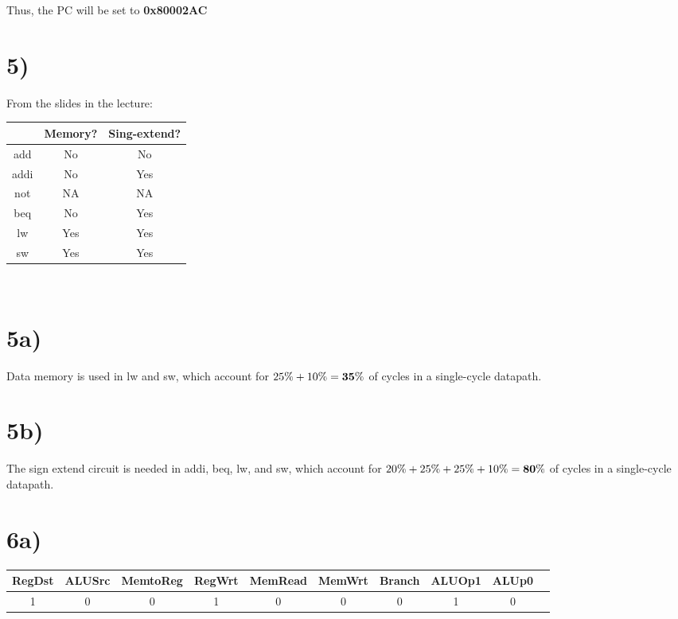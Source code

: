 \documentclass[a4paper,11pt]{article}
\begin{document}
Thus, the PC will be set to {\bf 0x80002AC}


\section*{5)}
From the slides in the lecture:\\

\begin{tabular}{| c | c | c |}
  \hline	
        & Memory? & Sing-extend? \\  \hline
   add & No & No \\  \hline
   addi & No & Yes \\  \hline
   not & NA & NA \\  \hline
   beq & No & Yes \\  \hline
   lw & Yes & Yes \\  \hline
   sw & Yes & Yes \\  \hline
\end{tabular} \\

\section*{5a)}
Data memory is used in lw and sw, which account for $25\% + 10\% = {\bf 35\%}$ of cycles in a single-cycle datapath.

\section*{5b)}
The sign extend circuit is needed in addi, beq, lw, and sw, which account for $20\% + 25\% + 25\% + 10\% = {\bf 80\%}$ of cycles in a 
single-cycle datapath.


\section*{6a)}
\begin{tabular}{| c | c | c | c | c | c | c | c | c | c |}
  \hline	
  RegDst & ALUSrc & MemtoReg & RegWrt & MemRead & MemWrt & Branch & ALUOp1 & ALUp0 \\  \hline
  1 & 0 & 0 & 1 & 0 & 0 & 0 & 1 & 0 \\  \hline
\end{tabular} \\
\end{document}
